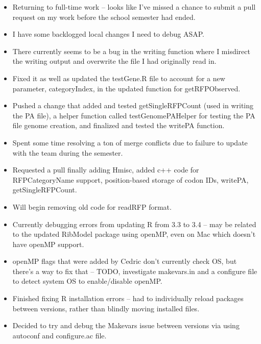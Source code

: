 \documentclass[12pt,hyperref]{labbook}
\begin{document}
\begin{itemize}
    \item Returning to full-time work -- looks like I've missed a chance to submit a pull request on my work before the school semester had ended.
    \item I have some backlogged local changes I need to debug ASAP.
    \item There currently seems to be a bug in the writing function where I misdirect the writing output and overwrite the file I had originally read in.
    \item Fixed it as well as updated the testGene.R file to account for a new parameter, categoryIndex, in the updated function for getRFPObserved.
    \item Pushed a change that added and tested getSingleRFPCount (used in writing the PA file), a helper function called testGenomePAHelper for testing the PA file genome creation, and finalized and tested the writePA function.
    \item Spent some time resolving a ton of merge conflicts due to failure to update with the team during the semester.
    \item Requested a pull finally adding Hmisc, added c++ code for RFPCategoryName support, position-based storage of codon IDs, writePA, getSingleRFPCount.
\end{itemize}


\begin{itemize}
    \item Will begin removing old code for readRFP format.
    \item Currently debugging errors from updating R from 3.3 to 3.4 -- may be related to the updated RibModel package using openMP, even on Mac which doesn't have openMP support.
\end{itemize}


\begin{itemize}
    \item openMP flags that were added by Cedric don't currently check OS, but there's a way to fix that -- TODO, investigate makevars.in and a configure file to detect system OS to enable/disable openMP.
    \item Finished fixing R installation errors -- had to individually reload packages between versions, rather than blindly moving installed files.
    \item Decided to try and debug the Makevars issue between versions via using autoconf and configure.ac file.
\end{itemize}
\end{document}
